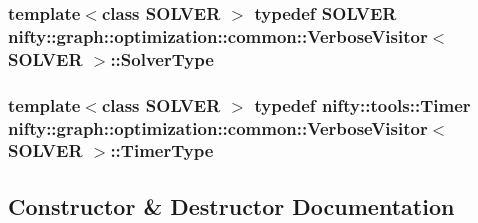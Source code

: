 \subsubsection[{Solver\+Type}]{\setlength{\rightskip}{0pt plus 5cm}template$<$class S\+O\+L\+V\+E\+R $>$ typedef S\+O\+L\+V\+E\+R {\bf nifty\+::graph\+::optimization\+::common\+::\+Verbose\+Visitor}$<$ S\+O\+L\+V\+E\+R $>$\+::{\bf Solver\+Type}}\label{classnifty_1_1graph_1_1optimization_1_1common_1_1VerboseVisitor_a5aa8c805242bf435548e2367674092d3}
\hypertarget{classnifty_1_1graph_1_1optimization_1_1common_1_1VerboseVisitor_a2b974614fdd9abcb04d4b479d6c1ce00}{}
\subsubsection[{Timer\+Type}]{\setlength{\rightskip}{0pt plus 5cm}template$<$class S\+O\+L\+V\+E\+R $>$ typedef {\bf nifty\+::tools\+::\+Timer} {\bf nifty\+::graph\+::optimization\+::common\+::\+Verbose\+Visitor}$<$ S\+O\+L\+V\+E\+R $>$\+::{\bf Timer\+Type}}\label{classnifty_1_1graph_1_1optimization_1_1common_1_1VerboseVisitor_a2b974614fdd9abcb04d4b479d6c1ce00}


\subsection{Constructor \& Destructor Documentation}
\hypertarget{classnifty_1_1graph_1_1optimization_1_1common_1_1VerboseVisitor_a028c3f88308487c69c4a2bf03b888a46}{}
